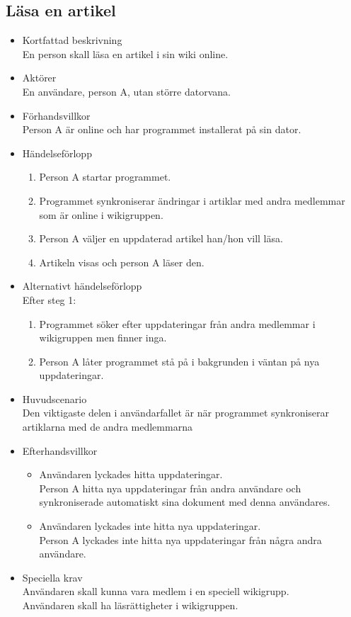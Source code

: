 \subsection{Läsa en artikel}
\begin{itemize}
	\item Kortfattad beskrivning
	\\En person skall läsa en artikel i sin wiki online.
	\item Aktörer
	\\En användare, person A, utan större datorvana.
	\item Förhandsvillkor
	\\Person A är online och har programmet installerat på sin dator.
	\item Händelseförlopp
	\begin{enumerate}
		\item Person A startar programmet.
		\item Programmet synkroniserar ändringar i artiklar med andra medlemmar som är online i wikigruppen.
		\item Person A väljer en uppdaterad artikel han/hon vill läsa.
		\item Artikeln visas och person A läser den.
	\end{enumerate}
	\item Alternativt händelseförlopp
	\\Efter steg 1:
	\begin{enumerate}	
		\item Programmet söker efter uppdateringar från andra medlemmar i wikigruppen men finner inga.
		\item Person A låter programmet stå på i bakgrunden i väntan på nya uppdateringar.	
	\end{enumerate}	
	\item Huvudscenario
	\\Den viktigaste delen i användarfallet är när programmet synkroniserar artiklarna med de andra medlemmarna
	\item Efterhandsvillkor
	\begin{itemize}
		\item Användaren lyckades hitta uppdateringar.
		\\Person A hitta nya uppdateringar från andra användare och synkroniserade automatiskt sina dokument med denna användares.
		\item Användaren lyckades inte hitta nya uppdateringar.
		\\Person A lyckades inte hitta nya uppdateringar från några andra användare.
	\end{itemize}	
	\item Speciella krav
	\\Användaren skall kunna vara medlem i en speciell wikigrupp.
	\\Användaren skall ha läsrättigheter i wikigruppen.
\end{itemize}

